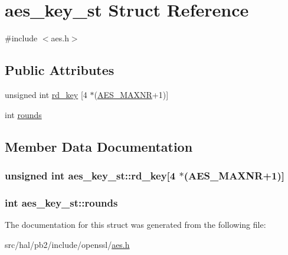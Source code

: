 \hypertarget{structaes__key__st}{}\section{aes\+\_\+key\+\_\+st Struct Reference}
\label{structaes__key__st}


{\ttfamily \#include $<$aes.\+h$>$}

\subsection*{Public Attributes}
\begin{DoxyCompactItemize}
\item 
unsigned int \hyperlink{structaes__key__st_a4746bac89cfc3a3bc9c8bd6a8a47db59}{rd\+\_\+key} \mbox{[}4 $\ast$(\hyperlink{aes_8h_ab517fa1010f3c588859797f1b87c4bcd}{A\+E\+S\+\_\+\+M\+A\+X\+NR}+1)\mbox{]}
\item 
int \hyperlink{structaes__key__st_aa87061a8d8d0b11de2933ee88cb91f18}{rounds}
\end{DoxyCompactItemize}


\subsection{Member Data Documentation}
\subsubsection[{\texorpdfstring{rd\+\_\+key}{rd_key}}]{\setlength{\rightskip}{0pt plus 5cm}unsigned int aes\+\_\+key\+\_\+st\+::rd\+\_\+key\mbox{[}4 $\ast$({\bf A\+E\+S\+\_\+\+M\+A\+X\+NR}+1)\mbox{]}}\hypertarget{structaes__key__st_a4746bac89cfc3a3bc9c8bd6a8a47db59}{}\label{structaes__key__st_a4746bac89cfc3a3bc9c8bd6a8a47db59}
\subsubsection[{\texorpdfstring{rounds}{rounds}}]{\setlength{\rightskip}{0pt plus 5cm}int aes\+\_\+key\+\_\+st\+::rounds}\hypertarget{structaes__key__st_aa87061a8d8d0b11de2933ee88cb91f18}{}\label{structaes__key__st_aa87061a8d8d0b11de2933ee88cb91f18}


The documentation for this struct was generated from the following file\+:\begin{DoxyCompactItemize}
\item 
src/hal/pb2/include/openssl/\hyperlink{aes_8h}{aes.\+h}\end{DoxyCompactItemize}

